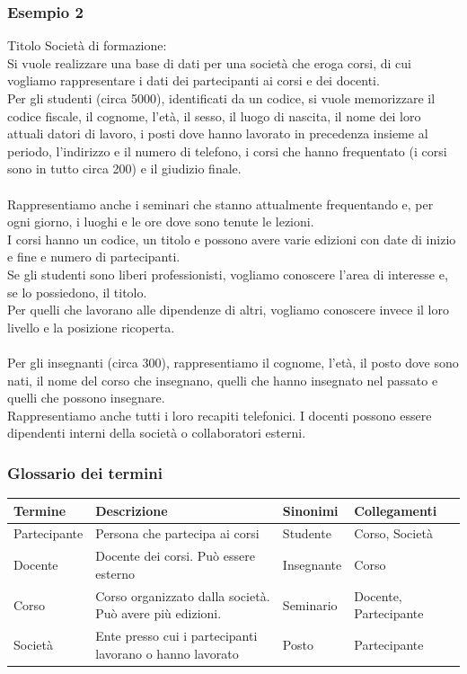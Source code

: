 \documentclass[../main.tex]{subfiles}
\begin{document}
	\subsubsection{Esempio 2}
	Titolo Società di formazione:\\
	Si vuole realizzare una base di dati per una società che eroga corsi, di cui vogliamo rappresentare i dati dei partecipanti ai corsi e dei docenti. \\
	Per gli studenti (circa 5000), identificati da un codice, si vuole memorizzare il codice fiscale, il cognome, l'età, il sesso, il luogo di nascita, il nome dei loro attuali datori di lavoro, i posti dove hanno lavorato in precedenza insieme al periodo, l'indirizzo e il numero di telefono, i corsi che hanno frequentato (i corsi sono in tutto circa 200) e il giudizio finale.\\\\
	Rappresentiamo anche i seminari che stanno attualmente frequentando e, per ogni giorno, i luoghi e le ore dove sono tenute le lezioni. \\
	I corsi hanno un codice, un titolo e possono avere varie edizioni con date di inizio e fine e numero di partecipanti. \\
	Se gli studenti sono liberi professionisti, vogliamo conoscere l'area di interesse e, se lo possiedono, il titolo. \\
	Per quelli che lavorano alle dipendenze di altri, vogliamo conoscere invece il loro livello e la posizione ricoperta.\\\\
	Per gli insegnanti (circa 300), rappresentiamo il cognome, l'età, il posto dove sono nati, il nome del corso che insegnano, quelli che hanno insegnato nel passato e quelli che possono insegnare. \\
	Rappresentiamo anche tutti i loro recapiti telefonici. I docenti possono essere dipendenti interni della società o collaboratori esterni.
	\subsubsection{Glossario dei termini}
	\begin{center}
		\begin{tabular}{|l|p{5cm}|l|l|}
			\hline
			\textbf{Termine} & \textbf{Descrizione} & \textbf{Sinonimi} & \textbf{Collegamenti} \\
			\hline
			Partecipante & Persona che partecipa ai corsi & Studente & Corso, Società \\
			\hline
			Docente & Docente dei corsi. Può essere esterno & Insegnante & Corso \\
			\hline
			Corso & Corso organizzato dalla società. Può avere più edizioni. & Seminario & Docente, Partecipante \\
			\hline
			Società & Ente presso cui i partecipanti lavorano o hanno lavorato & Posto & Partecipante \\
			\hline
		\end{tabular}
	\end{center}
\end{document}

